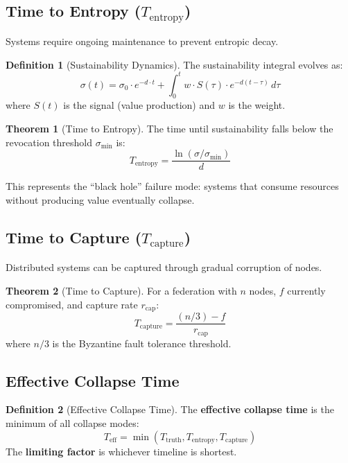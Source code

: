 \documentclass[11pt,a4paper]{article}
\theoremstyle{definition}
\newtheorem{definition}{Definition}[section]
\newtheorem{theorem}{Theorem}[section]
\theoremstyle{remark}
\newcommand{\Ttruth}{T_{\text{truth}}}
\newcommand{\Tentropy}{T_{\text{entropy}}}
\newcommand{\Tcapture}{T_{\text{capture}}}
\newcommand{\Teff}{T_{\text{eff}}}
\newcommand{\sigmin}{\sigma_{\text{min}}}
\begin{document}
\subsection{Time to Entropy ($\Tentropy$)}

Systems require ongoing maintenance to prevent entropic decay.

\begin{definition}[Sustainability Dynamics]
The sustainability integral evolves as:
\begin{equation}
\sigma(t) = \sigma_0 \cdot e^{-d \cdot t} + \int_0^t w \cdot S(\tau) \cdot e^{-d(t-\tau)} \, d\tau
\end{equation}
where $S(t)$ is the signal (value production) and $w$ is the weight.
\end{definition}

\begin{theorem}[Time to Entropy]
The time until sustainability falls below the revocation threshold $\sigmin$ is:
\begin{equation}
\Tentropy = \frac{\ln(\sigma/\sigmin)}{d}
\label{eq:Tentropy}
\end{equation}
\end{theorem}

This represents the ``black hole'' failure mode: systems that consume resources without producing value eventually collapse.

\subsection{Time to Capture ($\Tcapture$)}

Distributed systems can be captured through gradual corruption of nodes.

\begin{theorem}[Time to Capture]
For a federation with $n$ nodes, $f$ currently compromised, and capture rate $r_{\text{cap}}$:
\begin{equation}
\Tcapture = \frac{(n/3) - f}{r_{\text{cap}}}
\label{eq:Tcapture}
\end{equation}
where $n/3$ is the Byzantine fault tolerance threshold.
\end{theorem}

\subsection{Effective Collapse Time}

\begin{definition}[Effective Collapse Time]
The \textbf{effective collapse time} is the minimum of all collapse modes:
\begin{equation}
\Teff = \min(\Ttruth, \Tentropy, \Tcapture)
\end{equation}
The \textbf{limiting factor} is whichever timeline is shortest.
\end{definition}
\end{document}
